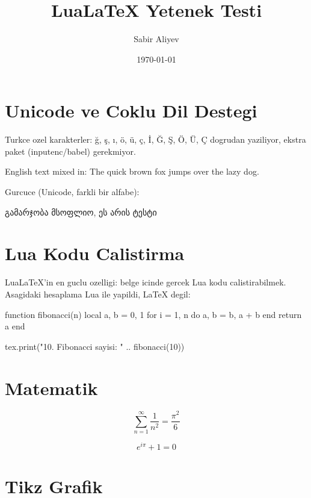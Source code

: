 \documentclass[12pt]{article}
\title{LuaLaTeX Yetenek Testi}
\author{Sabir Aliyev}
\date{\today}
\begin{document}
\maketitle

\section{Unicode ve Coklu Dil Destegi}
Turkce ozel karakterler: ğ, ş, ı, ö, ü, ç, İ, Ğ, Ş, Ö, Ü, Ç dogrudan yaziliyor,
ekstra paket (inputenc/babel) gerekmiyor.

\begin{english}
English text mixed in: The quick brown fox jumps over the lazy dog.
\end{english}

Gurcuce (Unicode, farkli bir alfabe):
\begin{center}
{ გამარჯობა მსოფლიო, ეს არის ტესტი}
\end{center}

\section{Lua Kodu Calistirma}
LuaLaTeX'in en guclu ozelligi: belge icinde gercek Lua kodu calistirabilmek.
Asagidaki hesaplama Lua ile yapildi, LaTeX degil:

\begin{luacode}
function fibonacci(n)
  local a, b = 0, 1
  for i = 1, n do
    a, b = b, a + b
  end
  return a
end

tex.print("10. Fibonacci sayisi: " .. fibonacci(10))
\end{luacode}

\section{Matematik}
\begin{equation}
    \sum_{n=1}^{\infty} \frac{1}{n^2} = \frac{\pi^2}{6}
\end{equation}

\begin{equation}
    e^{i\pi} + 1 = 0
\end{equation}

\section{Tikz Grafik}
\begin{center}
\end{center}
\end{document}
